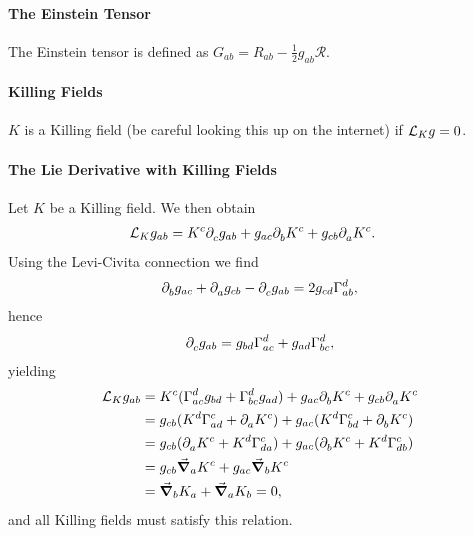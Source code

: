 \paragraph{The Einstein Tensor}
The Einstein tensor is defined as $G_{ab} = R_{ab} - \frac{1}{2}g_{ab}\mathcal{R}$.

\paragraph{Killing Fields}
$K$ is a Killing field (be careful looking this up on the internet) if $\mathcal{L}_{K}g = 0$.

\paragraph{The Lie Derivative with Killing Fields}
Let $K$ be a Killing field. We then obtain
\begin{align*}
	\mathcal{L}_{K}g_{ab} &= K^{c}\partial^{}_{c}g_{ab} + g_{ac}\partial^{}_{b}K^{c} + g_{cb}\partial^{}_{a}K^{c}.
\end{align*}
Using the Levi-Civita connection we find
\begin{align*}
	\del{b}{g_{ac}} + \del{a}{g_{cb}} - \del{c}{g_{ab}} = 2g_{cd}\chris{d}{a}{b},
\end{align*}
hence
\begin{align*}
	\del{c}{g_{ab}} = g_{bd}\chris{d}{a}{c} + g_{ad}\chris{d}{b}{c},
\end{align*}
yielding
\begin{align*}
	\lied{K}{g_{ab}} &= K^{c}(\chris{d}{a}{c}g_{bd} + \chris{d}{b}{c}g_{ad}) + g_{ac}\del{b}{K^{c}} + g_{cb}\del{a}{K^{c}} \\
	                 &= g_{cb}(K^{d}\chris{c}{a}{d} + \del{a}{K^{c}}) + g_{ac}(K^{d}\chris{c}{b}{d} + \del{b}{K^{c}}) \\
	                 &= g_{cb}(\del{a}{K^{c}} + K^{d}\chris{c}{d}{a}) + g_{ac}(\del{b}{K^{c}} + K^{d}\chris{c}{d}{b}) \\
	                 &= g_{cb}\dcov{a}{K^{c}} + g_{ac}\dcov{b}{K^{c}} \\
	                 &= \dcov{b}{K_{a}} + \dcov{a}{K_{b}} = 0,
\end{align*}
and all Killing fields must satisfy this relation.

